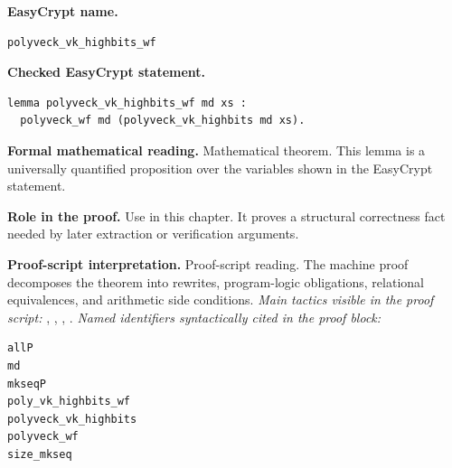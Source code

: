 \begin{formaltheorem}
\noindent\textbf{EasyCrypt name.}
\begin{lstlisting}[language=EasyCrypt,basicstyle=\ttfamily\scriptsize]
polyveck_vk_highbits_wf
\end{lstlisting}
\noindent\textbf{Checked EasyCrypt statement.}
\begin{lstlisting}[language=EasyCrypt,basicstyle=\ttfamily\scriptsize]
lemma polyveck_vk_highbits_wf md xs :
  polyveck_wf md (polyveck_vk_highbits md xs).
\end{lstlisting}
\noindent\textbf{Formal mathematical reading.}
Mathematical theorem. This lemma is a universally quantified proposition over the variables shown in the EasyCrypt statement.

\noindent\textbf{Role in the proof.}
Use in this chapter. It proves a structural correctness fact needed by later extraction or verification arguments.

\noindent\textbf{Proof-script interpretation.}
Proof-script reading. The machine proof decomposes the theorem into rewrites, program-logic obligations, relational equivalences, and arithmetic side conditions.
\emph{Main tactics visible in the proof script:} , , , .
\emph{Named identifiers syntactically cited in the proof block:}
\begin{lstlisting}[language=EasyCrypt,basicstyle=\ttfamily\scriptsize]
allP
md
mkseqP
poly_vk_highbits_wf
polyveck_vk_highbits
polyveck_wf
size_mkseq
\end{lstlisting}

\end{formaltheorem}

